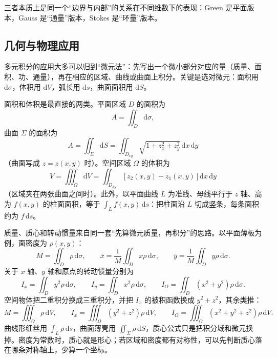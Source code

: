 三者本质上是同一个“边界与内部”的关系在不同维数下的表现：Green 是平面版本，Gauss 是“通量”版本，Stokes 是“环量”版本。
\subsection{几何与物理应用}

多元积分的应用大多可以归到“微元法”：先写出一个微小部分对应的量（质量、面积、功、通量），再在相应的区域、曲线或曲面上积分。关键是选对微元：面积用 $\mathrm d\sigma$，体积用 $\mathrm dV$，弧长用 $\mathrm ds$，曲面面积用 $\mathrm dS$。

面积和体积是最直接的两类。平面区域 $D$ 的面积为
\[
    A=\iint_D\mathrm d\sigma ,
\]
曲面 $\Sigma$ 的面积为
\[
    A=\iint_\Sigma\mathrm dS
    =\iint_{D_{xy}}\sqrt{1+z_x^2+z_y^2}\,\mathrm dx\,\mathrm dy
\]
（曲面写成 $z=z(x,y)$ 时）。空间区域 $\Omega$ 的体积为
\[
    V=\iiint_\Omega\mathrm dV
    =\iint_{D_{xy}}\left[z_2(x,y)-z_1(x,y)\right]\mathrm dx\,\mathrm dy
\]
（区域夹在两张曲面之间时）。此外，以平面曲线 $L$ 为准线、母线平行于 $z$ 轴、高为 $f(x,y)$ 的柱面面积，等于 $\int_L f(x,y)\,\mathrm ds$：把柱面沿 $L$ 切成竖条，每条面积约为 $f\,\mathrm ds$。

质量、质心和转动惯量来自同一套“先算微元质量，再积分”的思路。以平面薄板为例，面密度为 $\rho(x,y)$：
\[
    M=\iint_D\rho\,\mathrm d\sigma,\qquad
    \bar x=\frac1M\iint_D x\rho\,\mathrm d\sigma,\qquad
    \bar y=\frac1M\iint_D y\rho\,\mathrm d\sigma .
\]
关于 $x$ 轴、$y$ 轴和原点的转动惯量分别为
\[
    I_x=\iint_D y^2\rho\,\mathrm d\sigma,\qquad
    I_y=\iint_D x^2\rho\,\mathrm d\sigma,\qquad
    I_O=\iint_D(x^2+y^2)\rho\,\mathrm d\sigma .
\]
空间物体把二重积分换成三重积分，并把 $I_x$ 的被积函数换成 $y^2+z^2$，其余类推：
\[
    M=\iiint_\Omega\rho\,\mathrm dV,\qquad
    I_x=\iiint_\Omega(y^2+z^2)\rho\,\mathrm dV,\qquad
    I_O=\iiint_\Omega(x^2+y^2+z^2)\rho\,\mathrm dV .
\]
曲线形细丝用 $\int_L\rho\,\mathrm ds$，曲面薄壳用 $\iint_\Sigma\rho\,\mathrm dS$，质心公式只是把积分域和微元换掉。密度为常数时，质心就是形心；若区域和密度都有对称性，可以先判断质心落在哪条对称轴上，少算一个坐标。

